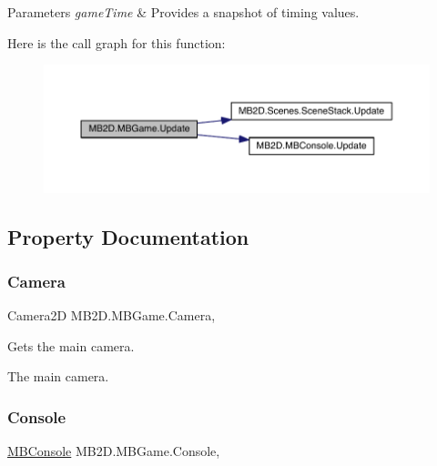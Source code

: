 \begin{DoxyParams}{Parameters}
{\em game\+Time} & Provides a snapshot of timing values.\\
\hline
\end{DoxyParams}
Here is the call graph for this function\+:\nopagebreak
\begin{figure}[H]
\begin{center}
\leavevmode
\includegraphics[width=350pt]{class_m_b2_d_1_1_m_b_game_a82968a66f75f9c437074ce7bfd468455_cgraph}
\end{center}
\end{figure}


\subsection{Property Documentation}
\hypertarget{class_m_b2_d_1_1_m_b_game_adec48f512c50332353b12a569630defe}{}\label{class_m_b2_d_1_1_m_b_game_adec48f512c50332353b12a569630defe} 
\subsubsection{\texorpdfstring{Camera}{Camera}}
{\footnotesize\ttfamily Camera2D M\+B2\+D.\+M\+B\+Game.\+Camera\hspace{0.3cm}{\ttfamily [static]}, {\ttfamily [get]}}



Gets the main camera. 

The main camera.\hypertarget{class_m_b2_d_1_1_m_b_game_a0db7935dd8a9f15b2dce1031920a4127}{}\label{class_m_b2_d_1_1_m_b_game_a0db7935dd8a9f15b2dce1031920a4127} 
\subsubsection{\texorpdfstring{Console}{Console}}
{\footnotesize\ttfamily \hyperlink{class_m_b2_d_1_1_m_b_console}{M\+B\+Console} M\+B2\+D.\+M\+B\+Game.\+Console\hspace{0.3cm}{\ttfamily [static]}, {\ttfamily [get]}}



